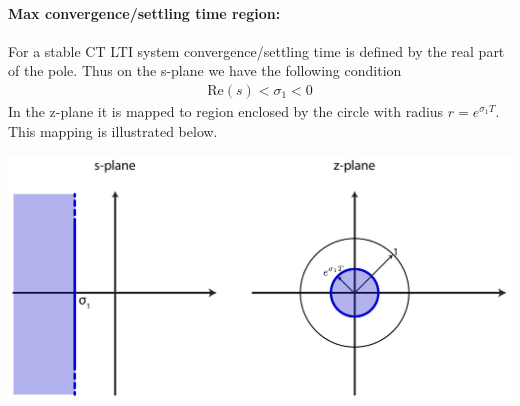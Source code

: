 \documentclass[twoside]{article}
\begin{document}
\paragraph{Max convergence/settling time region:} For a stable 
CT LTI system convergence/settling time is defined by the 
real part of the pole. Thus on the s-plane we have the following 
condition
%
\begin{align*}
\mathrm{Re}(s) < \sigma_1 < 0 
\end{align*}
%
In the z-plane it is mapped to region enclosed by the 
circle with radius $r = e^{\sigma_1 T}$. This mapping is illustrated 
below.
%
    \begin{center}
\begin{minipage}[h]{0.85\linewidth}
    \begin{center}
      \includegraphics[width=\textwidth]{settling}
    \end{center}
\end{minipage}
    \end{center}
%
\end{document}
